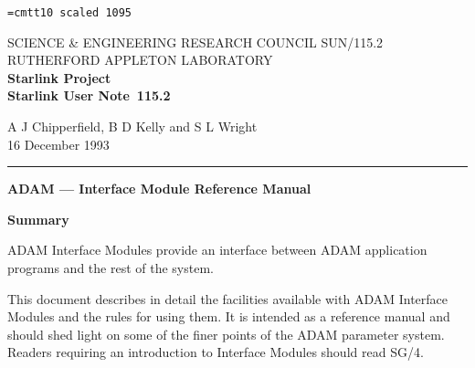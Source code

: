 \pagestyle{myheadings}

\newcommand{\stardoccategory}  {Starlink User Note}
\newcommand{\stardocinitials}  {SUN}
\newcommand{\stardocnumber}    {115.2}
\newcommand{\stardocauthors}   {A J Chipperfield, B D Kelly and S L Wright}
\newcommand{\stardocdate}      {16 December 1993}
\newcommand{\stardoctitle}     {ADAM --- Interface Module Reference Manual}

\newcommand{\stardocname}{\stardocinitials /\stardocnumber}
\markright{\stardocname}
\setlength{\textwidth}{160mm}
\setlength{\textheight}{230mm}
\setlength{\topmargin}{-2mm}
\setlength{\oddsidemargin}{0mm}
\setlength{\evensidemargin}{0mm}
\setlength{\parindent}{0mm}
\setlength{\parskip}{\medskipamount}
\setlength{\unitlength}{1mm}


\font\tt=cmtt10 scaled 1095
\renewcommand{\_}{{\tt\char'137}}  %


\thispagestyle{empty}
SCIENCE \& ENGINEERING RESEARCH COUNCIL \hfill \stardocname\\
RUTHERFORD APPLETON LABORATORY\\
{\large\bf Starlink Project\\}
{\large\bf \stardoccategory\ \stardocnumber}
\begin{flushright}
\stardocauthors\\
\stardocdate
\end{flushright}
\vspace{-4mm}
\rule{\textwidth}{0.5mm}
\vspace{5mm}
\begin{center}
{\Large\bf \stardoctitle}
\end{center}
\vspace{20mm}
\begin{center}
{\Large\bf Summary}
\end{center}
ADAM Interface Modules provide an interface between ADAM application programs 
and the rest of the system.

This document describes in detail the facilities available with ADAM Interface
Modules and the rules for using them. It is intended as a reference manual and
should shed light on some of the finer points of the ADAM parameter system.
Readers requiring an introduction to Interface Modules should read SG/4.


